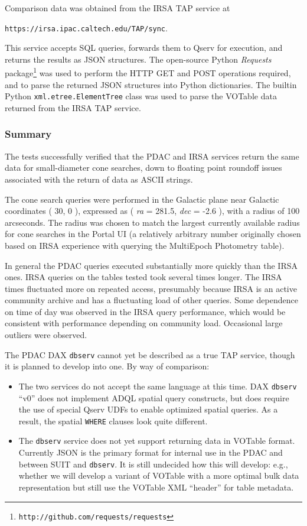 \documentclass[DM,lsstdraft,STR,toc]{lsstdoc}
\begin{document}
Comparison data was obtained from the IRSA TAP service at

\begin{center}
\texttt{https://irsa.ipac.caltech.edu/TAP/sync}.
\end{center}

This service accepts SQL queries, forwards them to Qserv for execution, and returns the results as JSON structures.
The open-source Python \emph{Requests} package\footnote{\texttt{http://github.com/requests/requests}} was used to perform the HTTP GET and POST operations required, and to parse the returned JSON structures into Python dictionaries.
The builtin Python \texttt{xml.etree.ElementTree} class was used to parse the VOTable data returned from the IRSA TAP service.

\subsubsection{Summary}

The tests successfully verified that the PDAC and IRSA services return the same data for small-diameter cone searches, 
down to floating point roundoff issues associated with the return of data as ASCII strings.

The cone search queries were performed in the Galactic plane near Galactic coordinates ( 30, 0 ),
expressed as ( \emph{ra} = 281.5, \emph{dec} = -2.6 ), with a radius of 100 arcseconds.
The radius was chosen to match the largest currently available radius for cone searches in the Portal UI 
(a relatively arbitrary number originally chosen based on IRSA experience with querying the MultiEpoch Photometry table).

In general the PDAC queries executed substantially more quickly than the IRSA ones.
IRSA queries on the tables tested took several times longer.
The IRSA times fluctuated more on repeated access, 
presumably because IRSA is an active community archive and has a fluctuating load of other queries.
Some dependence on time of day was observed in the IRSA query performance,
which would be consistent with performance depending on community load.
Occasional large outliers were observed.

The PDAC DAX \verb|dbserv| cannot yet be described as a true TAP service,
though it is planned to develop into one.
By way of comparison:

\begin{itemize}
\item{The two services do not accept the same language at this time.
DAX \texttt{dbserv} ``v0'' does not implement ADQL spatial query constructs, 
but does require the use of special Qserv UDFs to enable optimized spatial queries.
As a result, the spatial \texttt{WHERE} clauses look quite different.}
\item{The \verb|dbserv| service does not yet support returning data in VOTable format.
Currently JSON is the primary format for internal use in the PDAC and between SUIT and \verb|dbserv|.
It is still undecided how this will develop:
e.g., whether we will develop a variant of VOTable with a more optimal bulk data representation but still use the VOTable XML ``header'' for table metadata.}
\end{itemize}
\end{document}
